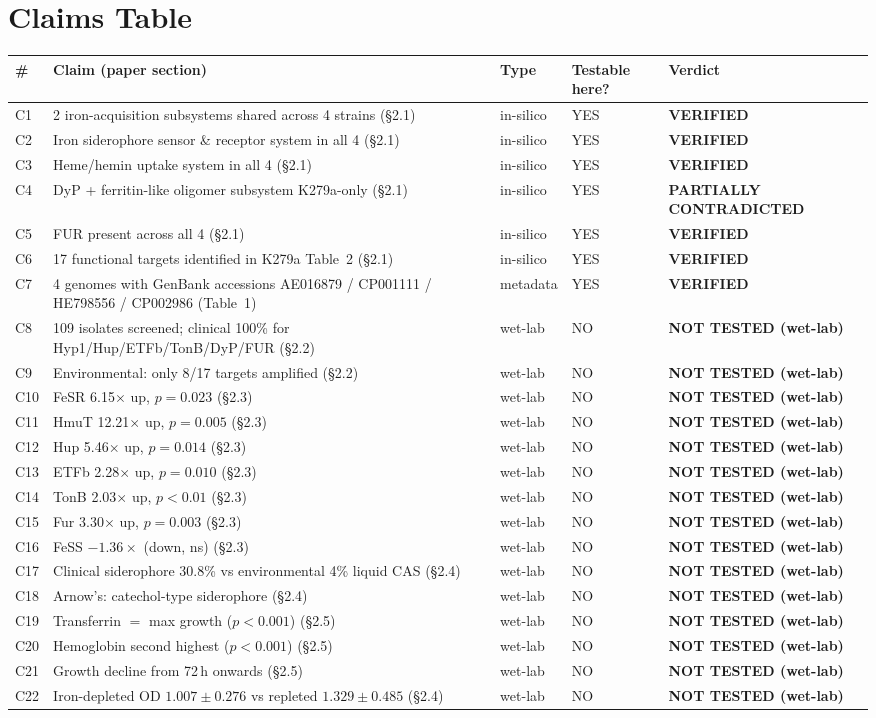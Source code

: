 \documentclass[10pt,a4paper]{article}
\newcommand{\vok}{{\color{teal}\textbf{VERIFIED}}}
\newcommand{\vpc}{{\color{orange}\textbf{PARTIALLY CONTRADICTED}}}
\newcommand{\vnt}{{\color{gray}\textbf{NOT TESTED (wet-lab)}}}
\begin{document}
\section{Claims Table}
\begin{longtable}{@{}p{0.4cm}p{8cm}p{2.4cm}p{2.4cm}p{1.9cm}@{}}
\toprule
\# & Claim (paper section) & Type & Testable\,here? & Verdict \\
\midrule\endhead
C1  & 2 iron-acquisition subsystems shared across 4 strains (§2.1) & in-silico & YES & \vok \\
C2  & Iron siderophore sensor \& receptor system in all 4 (§2.1) & in-silico & YES & \vok \\
C3  & Heme/hemin uptake system in all 4 (§2.1) & in-silico & YES & \vok \\
C4  & DyP + ferritin-like oligomer subsystem K279a-only (§2.1) & in-silico & YES & \vpc \\
C5  & FUR present across all 4 (§2.1) & in-silico & YES & \vok \\
C6  & 17 functional targets identified in K279a Table~2 (§2.1) & in-silico & YES & \vok \\
C7  & 4 genomes with GenBank accessions AE016879 / CP001111 / HE798556 / CP002986 (Table~1) & metadata & YES & \vok \\
C8  & 109 isolates screened; clinical 100\% for Hyp1/Hup/ETFb/TonB/DyP/FUR (§2.2) & wet-lab & NO & \vnt \\
C9  & Environmental: only 8/17 targets amplified (§2.2) & wet-lab & NO & \vnt \\
C10 & FeSR 6.15$\times$ up, $p{=}0.023$ (§2.3) & wet-lab & NO & \vnt \\
C11 & HmuT 12.21$\times$ up, $p{=}0.005$ (§2.3) & wet-lab & NO & \vnt \\
C12 & Hup 5.46$\times$ up, $p{=}0.014$ (§2.3) & wet-lab & NO & \vnt \\
C13 & ETFb 2.28$\times$ up, $p{=}0.010$ (§2.3) & wet-lab & NO & \vnt \\
C14 & TonB 2.03$\times$ up, $p{<}0.01$ (§2.3) & wet-lab & NO & \vnt \\
C15 & Fur 3.30$\times$ up, $p{=}0.003$ (§2.3) & wet-lab & NO & \vnt \\
C16 & FeSS $-1.36\times$ (down, ns) (§2.3) & wet-lab & NO & \vnt \\
C17 & Clinical siderophore 30.8\% vs environmental 4\% liquid CAS (§2.4) & wet-lab & NO & \vnt \\
C18 & Arnow's: catechol-type siderophore (§2.4) & wet-lab & NO & \vnt \\
C19 & Transferrin $=$ max growth ($p{<}0.001$) (§2.5) & wet-lab & NO & \vnt \\
C20 & Hemoglobin second highest ($p{<}0.001$) (§2.5) & wet-lab & NO & \vnt \\
C21 & Growth decline from 72\,h onwards (§2.5) & wet-lab & NO & \vnt \\
C22 & Iron-depleted OD $1.007{\pm}0.276$ vs repleted $1.329{\pm}0.485$ (§2.4) & wet-lab & NO & \vnt \\
\bottomrule
\end{longtable}
\end{document}
